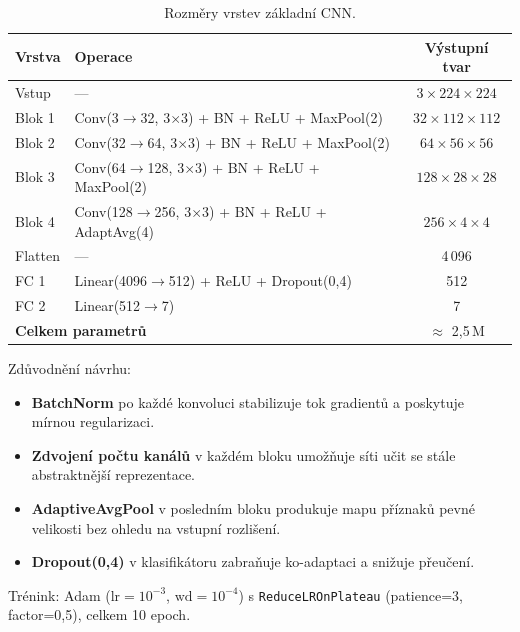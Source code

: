 \documentclass[12pt, a4paper]{article}
\begin{document}
\begin{table}[H]
    \centering
    \caption{Rozměry vrstev základní CNN.}
    \begin{tabular}{llc}
        \toprule
        \textbf{Vrstva} & \textbf{Operace} & \textbf{Výstupní tvar} \\
        \midrule
        Vstup   & ---                                                        & $3 \times 224 \times 224$ \\
        Blok 1  & Conv(3$\to$32, 3$\times$3) + BN + ReLU + MaxPool(2)       & $32 \times 112 \times 112$ \\
        Blok 2  & Conv(32$\to$64, 3$\times$3) + BN + ReLU + MaxPool(2)      & $64 \times 56 \times 56$ \\
        Blok 3  & Conv(64$\to$128, 3$\times$3) + BN + ReLU + MaxPool(2)     & $128 \times 28 \times 28$ \\
        Blok 4  & Conv(128$\to$256, 3$\times$3) + BN + ReLU + AdaptAvg(4)   & $256 \times 4 \times 4$ \\
        Flatten & ---                                                        & 4\,096 \\
        FC 1    & Linear(4096$\to$512) + ReLU + Dropout(0{,}4)              & 512 \\
        FC 2    & Linear(512$\to$7)                                         & 7 \\
        \midrule
        \multicolumn{2}{l}{\textbf{Celkem parametrů}} & $\approx$ 2{,}5\,M \\
        \bottomrule
    \end{tabular}
    \label{tab:baseline_arch}
\end{table}

Zdůvodnění návrhu:
\begin{itemize}
    \item \textbf{BatchNorm} po každé konvoluci stabilizuje tok gradientů
          a poskytuje mírnou regularizaci.
    \item \textbf{Zdvojení počtu kanálů} v každém bloku umožňuje síti učit se
          stále abstraktnější reprezentace.
    \item \textbf{AdaptiveAvgPool} v posledním bloku produkuje mapu příznaků
          pevné velikosti bez ohledu na vstupní rozlišení.
    \item \textbf{Dropout(0{,}4)} v klasifikátoru zabraňuje ko-adaptaci
          a snižuje přeučení.
\end{itemize}

Trénink: Adam ($\text{lr}=10^{-3}$, $\text{wd}=10^{-4}$) s
\texttt{ReduceLROnPlateau} (patience=3, factor=0{,}5), celkem 10 epoch.
\end{document}
